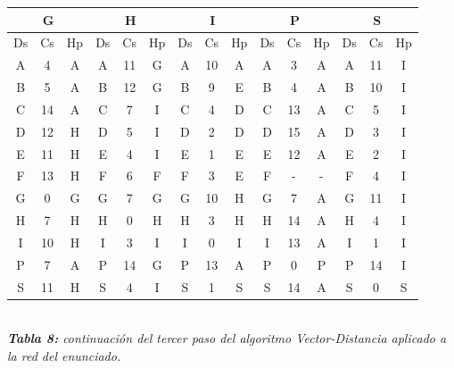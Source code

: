 \documentclass[letterpaper,10pt,onecolumn,titlepage]{article}
\begin{document}
  \begin{center}
   \begin{tabular}{|c|c|c|c|c|c|c|c|c|c|c|c|c|c|c|} \hline
     \multicolumn{3}{|c|}{G} & \multicolumn{3}{|c|}{H} &\multicolumn{3}{|c|}{I} & \multicolumn{3}{|c|}{P} & \multicolumn{3}{|c|}{S}    \\ \hline
     Ds & Cs & Hp & Ds & Cs & Hp & Ds & Cs & Hp & Ds & Cs & Hp & Ds & Cs & Hp  \\ \hline
     A  & 4  & A  & A  & 11  & G  & A  & 10  & A  & A  & 3  & A  & A  & 11  & I   \\ \hline
     B  & 5  & A  & B  & \color{red}12  & \color{red}G  & B  & 9  & E  & B  & 4  & A  & B  & \color{red}10  &\color{red} I   \\ \hline
     C  & \color{red}14  & \color{red}A  & C  & \color{red}7  & \color{red}I  & C  & 4  & D  & C  &\color{red} 13  &\color{red} A  & C  & \color{red}5  & \color{red}I   \\ \hline
     D  & \color{red}12  & \color{red}H  & D  & 5  & I  & D  & 2  & D  & D  & \color{red}15  & \color{red}A  & D  & 3  & I   \\ \hline
     E  & \color{red}11  & \color{red}H  & E  & 4  & I  & E  & 1  & E  & E  & \color{red}12  &\color{red} A  & E  & 2  & I   \\ \hline
     F  & 13  & H  & F  & 6  & F  & F  & 3  & E  & F  & -  & -  & F  & \color{red}4  & \color{red}I   \\ \hline
     G  & 0  & G  & G  & 7  & G  & G  & 10  & H  & G  & 7  & A  & G  & \color{red}11  &\color{red} I   \\ \hline
     H  & 7  & H  & H  & 0  & H  & H  & 3  & H  & H  & \color{red}14  & \color{red}A  & H  & 4  & I   \\ \hline
     I  & 10  & H  & I  & 3  & I  & I  & 0  & I  & I  & 13  & A  & I  & 1  & I   \\ \hline
     P  & 7  & A  & P  & \color{red}14  & \color{red}G  & P  & 13  & A  & P  & 0  & P  & P  & \color{red}14  &\color{red} I \\ \hline
     S  & \color{red}11  &\color{red} H  & S  & 4  & I  & S  & 1  & S  & S  & \color{red}14  & \color{red}A  & S  & 0  & S   \\ \hline
   \end{tabular}\\
   \textit{\textbf{Tabla 8:} continuación del tercer paso del algoritmo Vector-Distancia aplicado a la red del enunciado.}
 \end{center}
 
\end{document}
